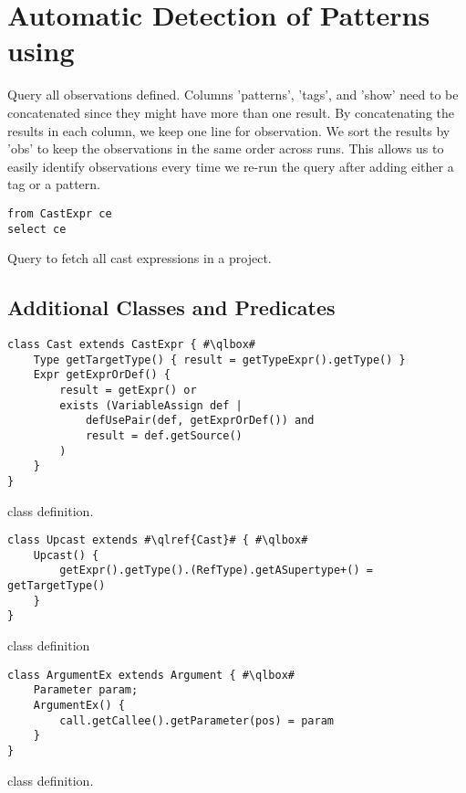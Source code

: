 \chapter{Automatic Detection of Patterns using \ql{}}\label{ap:ql}

Query all observations defined.
Columns 'patterns', 'tags', and 'show' need to be concatenated since they might have more than one result.
By concatenating the results in each column, we keep one line for observation.
We sort the results by 'obs' to keep the observations in the same order across runs.
This allows us to easily identify observations every time we re-run the query after adding either a tag or a pattern.

\begin{listing}
\begin{verbatim}
from CastExpr ce
select ce
\end{verbatim}
\caption{Query to fetch all cast expressions in a project.}
\end{listing}

\section{Additional \ql{} Classes and Predicates}

\begin{listing}
\begin{verbatim}
class Cast extends CastExpr { #\qlbox#
	Type getTargetType() { result = getTypeExpr().getType() }
	Expr getExprOrDef() {
		result = getExpr() or
		exists (VariableAssign def |
			defUsePair(def, getExprOrDef()) and
			result = def.getSource()
		)
	}
}
\end{verbatim}
\caption{ class definition.}
\label{lst:ql:Cast}
\end{listing}

\begin{listing}
\begin{verbatim}
class Upcast extends #\qlref{Cast}# { #\qlbox#
	Upcast() {
		getExpr().getType().(RefType).getASupertype+() = getTargetType()
	}
}
\end{verbatim}
\caption{ class definition}
\label{lst:ql:Upcast}
\end{listing}

\begin{listing}
\begin{verbatim}
class ArgumentEx extends Argument { #\qlbox#
	Parameter param;
	ArgumentEx() {
		call.getCallee().getParameter(pos) = param
	}
}
\end{verbatim}
\caption{ class definition.}
\label{lst:ql:ArgumentEx}
\end{listing}

